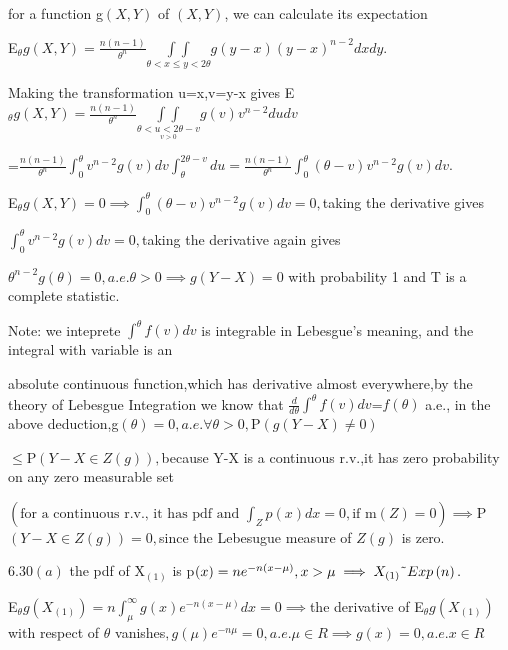 \documentclass{article}
\begin{document}
for a function g$\left( X,Y\right) $ of $\left( X,Y\right) $, we can
calculate its expectation

E$_{\theta }g\left( X,Y\right) =\frac{n\left( n-1\right) }{\theta ^{n}}%
\underset{\theta <x\leq y<2\theta }{\int \int }g\left( y-x\right) \left(
y-x\right) ^{n-2}dxdy.$

Making the transformation u=x,v=y-x gives E$_{\theta }g\left( X,Y\right) =%
\frac{n\left( n-1\right) }{\theta ^{n}}\underset{\underset{v>0}{\theta
<u<2\theta -v}}{\int \int }g\left( v\right) v^{n-2}dudv$

=$\frac{n\left( n-1\right) }{\theta ^{n}}\int_{0}^{\theta }v^{n-2}g\left(
v\right) dv\int_{\theta }^{2\theta -v}du=\frac{n\left( n-1\right) }{\theta
^{n}}\int_{0}^{\theta }\left( \theta -v\right) v^{n-2}g\left( v\right) dv.$

E$_{\theta }g\left( X,Y\right) =0\implies \int_{0}^{\theta }\left( \theta
-v\right) v^{n-2}g\left( v\right) dv=0,$taking the derivative gives

$\int_{0}^{\theta }v^{n-2}g\left( v\right) dv=0,$taking the derivative again
gives

$\theta ^{n-2}g\left( \theta \right) =0,a.e.\theta >0\implies g\left(
Y-X\right) =0$ with probability 1 and T is a complete statistic.

Note: we inteprete $\int^{\theta }f\left( v\right) dv$ is integrable in
Lebesgue's meaning, and the integral with variable is an

absolute continuous function,which has derivative almost everywhere,by the
theory of Lebesgue Integration we know that $\frac{d}{d\theta }\int^{\theta
}f\left( v\right) dv$=$f\left( \theta \right) $ a.e., in the above
deduction,g$\left( \theta \right) =0,a.e.\forall \theta >0,$P$\left( g\left(
Y-X\right) \neq 0\right) $

$\leq $P$\left( Y-X\in Z\left( g\right) \right) ,$because Y-X is a
continuous r.v.,it has zero probability on any zero measurable set

$\left( \text{for a continuous r.v., it has pdf and }\int_{Z}p\left(
x\right) dx=0,\text{if m}\left( Z\right) =0\right) \implies $P$\left( Y-X\in
Z\left( g\right) \right) =0,$since the Lebesugue measure of $Z\left(
g\right) $ is zero.

6.30$\left( a\right) $ the pdf of X$_{\left( 1\right) }$ is p$\left(
x\right) =ne^{-n\left( x-\mu \right) },x>\mu \implies X_{\left( 1\right) }%
\symbol{126}Exp\left( n\right) .$

E$_{\theta }g\left( X_{\left( 1\right) }\right) =n\int_{\mu }^{\infty
}g\left( x\right) e^{-n\left( x-\mu \right) }dx=0\implies $the derivative of
E$_{\theta }g\left( X_{\left( 1\right) }\right) $ with respect of $\theta $
vanishes$,g\left( \mu \right) e^{-n\mu }=0,a.e.\mu \in R\implies g\left(
x\right) =0,a.e.x\in R$
\end{document}
